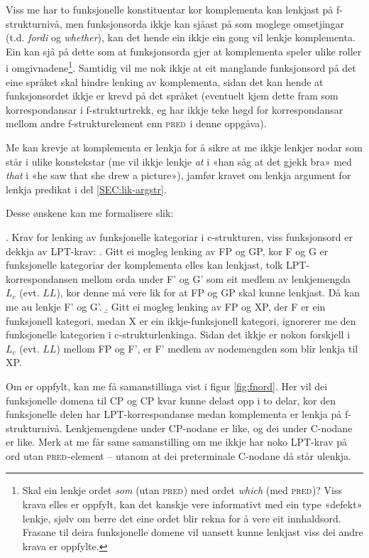 \documentclass[12pt,a4paper,oneside,draft]{report}
\newcommand{\F}[2]{\textsc{#1}\ensuremath{_{#2}}}
\newcommand{\PRED}{\F{pred}{}}
\begin{document}
Viss me har to funksjonelle konstituentar kor komplementa kan lenkjast
 på f\hyp{}strukturnivå, men funksjonsorda ikkje kan sjåast på som moglege
 omsetjingar (t.d. \emph{fordi} og \emph{whether}), kan det hende ein ikkje ein
 gong vil lenkje komplementa. Ein kan sjå på dette som at
 funksjonsorda gjer at komplementa speler ulike roller i
 omgivnadene\footnote{Skal ein lenkje ordet \emph{som} (utan \PRED{}) med ordet \emph{which} (med
        \PRED{})? Viss krava elles er oppfylt, kan det kanskje vere
        informativt med ein type «defekt» lenkje, sjølv om berre det
        eine ordet blir rekna for å vere eit innhaldsord. Frasane til
        deira funksjonelle domene vil uansett kunne lenkjast viss dei andre
        krava er oppfylte. }. Samtidig vil me nok ikkje at eit manglande
 funksjonsord på det eine språket skal hindre lenking av komplementa,
 sidan det kan hende at funksjonsordet ikkje er krevd på det språket
 (eventuelt kjem dette fram som korrespondansar i f\hyp{}strukturtrekk, eg
 har ikkje teke høgd for korrespondansar mellom andre
 f\hyp{}strukturelement enn \PRED{} i denne oppgåva).

Me kan krevje at komplementa er lenkja for å sikre at me ikkje lenkjer
 nodar som står i ulike konstekstar (me vil ikkje lenkje \emph{at} i «han
 såg at det gjekk bra» med \emph{that} i «he saw that she drew a picture»),
 jamfør kravet om lenkja argument for lenkja predikat i del
 \ref{SEC:lik-argstr}.

Desse ønskene kan me formalisere slik:

\ex. \label{fnordkrav} Krav for lenking av funksjonelle kategoriar i
    c\hyp{}strukturen, viss funksjonsord er dekkja av LPT-krav:
\a. Gitt ei mogleg lenking av FP og GP, kor F og G er funksjonelle
    kategoriar der komplementa elles kan lenkjast,
    tolk LPT\hyp{}korrespondansen mellom orda under F' og G' som eit
    medlem av lenkjemengda $L_c$ (evt. $LL$), kor denne må vere lik
    for at FP og GP skal kunne lenkjast. Då kan me au lenkje F' og G'.
\b. Gitt ei mogleg lenking av FP og XP, der F er ein funksjonell
    kategori, medan X er ein ikkje-funksjonell kategori, ignorerer me
    den funksjonelle kategorien i c\hyp{}strukturlenkinga. Sidan det ikkje
    er nokon forskjell i $L_c$ (evt. $LL$) mellom FP og F', er F' medlem
    av nodemengden som blir lenkja til XP.

Om \Last[a] er oppfylt, kan me få samanstillinga vist i figur
 \ref{fig:fnord}. Her vil dei funksjonelle domena til CP og CP kvar
 kunne delast opp i to delar, kor den funksjonelle delen har
 LPT\hyp{}korrespondanse medan komplementa er lenkja på
 f\hyp{}strukturnivå. Lenkjemengdene under CP-nodane er like, og dei under
 C-nodane er like. Merk at me får same samanstilling om me ikkje har
 noko LPT-krav på ord utan \PRED{}-element -- utanom at dei
 preterminale C-nodane då står ulenkja.
\end{document}
